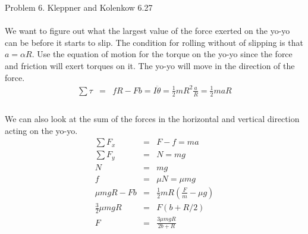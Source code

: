 \documentclass[11pt]{amsart}
\begin{document}
Problem 6. Kleppner and Kolenkow 6.27 \\ \\
We want to figure out what the largest value of the force exerted on the yo-yo can be before it starts to slip. The condition for rolling without of slipping is that $a=\alpha{R}$. Use the equation of motion for the torque on the yo-yo since the force and friction will exert torques on it. The yo-yo will move in the direction of the force. \\
\begin{eqnarray*}
\sum{\tau} &=& fR-Fb = I\ddot{\theta} = \frac{1}{2}mR^{2}\frac{a}{R} = \frac{1}{2}maR \\
\end{eqnarray*} \\
We can also look at the sum of the forces in the horizontal and vertical direction acting on the yo-yo. \\
\begin{eqnarray*}
\sum{F_{x}} &=& F-f= ma \\
\sum{F_{y}} &=& N=mg \\
N &=& mg \\
f &=& \mu{N} = \mu{mg} \\
\mu{mg}R-Fb &=& \frac{1}{2}mR(\frac{F}{m}-\mu{g}) \\
\frac{3}{2}\mu{mg}R &=& F(b+R/2) \\
F &=& \frac{3\mu{mgR}}{2b+R} \\
\end{eqnarray*} \\
\end{document}
